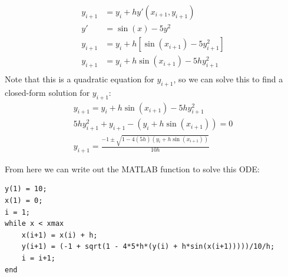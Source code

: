 \documentclass[letterpaper, fontsize=11pt]{scrartcl} %
\numberwithin{equation}{section} %
\numberwithin{figure}{section} %
\numberwithin{table}{section} %
\begin{document}
\begin{enumerate}
\begin{align*}
y_{i+1} &= y_i + hy'(x_{i+1},y_{i+1})\\
y' &= \sin(x) - 5y^2\\
y_{i+1} &= y_i + h\left[ \sin(x_{i+1}) - 5y_{i+1}^2\right] \\
y_{i+1} &= y_i + h \sin(x_{i+1}) - 5hy_{i+1}^2 \\
\end{align*}
Note that this is a quadratic equation for $y_{i+1}$, so we can solve this to find a closed-form solution for $y_{i+1}$:
\begin{gather*}
y_{i+1} = y_i + h \sin(x_{i+1}) - 5hy_{i+1}^2 \\
5hy_{i+1}^2 + y_{i+1} - (y_i + h \sin(x_{i+1})) = 0\\
y_{i+1} = \frac{-1 \pm\sqrt{1 - 4(5h)(y_i+h\sin(x_{i+1}))}}{10h}
\end{gather*}

From here we can write out the MATLAB function to solve this ODE:

\begin{lstlisting} 
y(1) = 10; 
x(1) = 0;
i = 1;
while x < xmax
	x(i+1) = x(i) + h;
	y(i+1) = (-1 + sqrt(1 - 4*5*h*(y(i) + h*sin(x(i+1)))))/10/h;
	i = i+1;
end

\end{lstlisting}

\end{enumerate}

\end{document}
